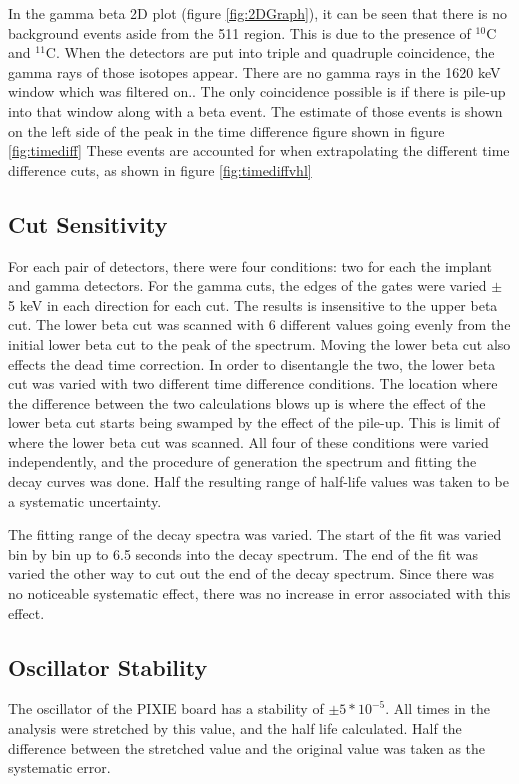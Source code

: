 \documentclass[MaxHughesThesis.tex]{subfiles}
\begin{document}
In the gamma beta 2D plot (figure \ref{fig:2DGraph}), it can be seen that there is no background events aside from the 511 region.
This is due to the presence of $^{10}$C and $^{11}$C.
When the detectors are put into triple and quadruple coincidence, the gamma rays of those isotopes appear.
There are no gamma rays in the 1620 keV window which was filtered on..
The only coincidence possible is if there is pile-up into that window along with a beta event.
The estimate of those events is shown on the left side of the peak in the time difference figure shown in figure \ref{fig:timediff}  
These events are accounted for when extrapolating the different time difference cuts, as shown in figure \ref{fig:timediffvhl}

\subsection{Cut Sensitivity}
For each pair of detectors, there were four conditions: two for each the implant and gamma detectors. 
For the gamma cuts, the edges of the gates were varied $\pm$ 5 keV in each direction for each cut.
The results is insensitive to the upper beta cut.
The lower beta cut was scanned with 6 different values going evenly from the initial lower beta cut to the peak of the spectrum.
Moving the lower beta cut also effects the dead time correction.
In order to disentangle the two, the lower beta cut was varied with two different time difference conditions.
The location where the difference between the two calculations blows up is where the effect of the lower beta cut starts being swamped by the effect of the pile-up.
This is limit of where the lower beta cut was scanned.
All four of these conditions were varied independently, and the procedure of generation the spectrum and fitting the decay curves was done.
Half the resulting range of half-life values was taken to be a systematic uncertainty.
	
The fitting range of the decay spectra was varied. 
The start of the fit was varied bin by bin up to 6.5 seconds into the decay spectrum.
The end of the fit was varied the other way to cut out the end of the decay spectrum.
Since there was no noticeable systematic effect, there was no increase in error associated with this effect.

\subsection{Oscillator Stability}
The oscillator of the PIXIE board has a stability of $\pm 5 * 10^{-5}$.
All times in the analysis were stretched by this value, and the half life calculated.
Half the difference between the stretched value and the original value was taken as the systematic error. 
\end{document}

